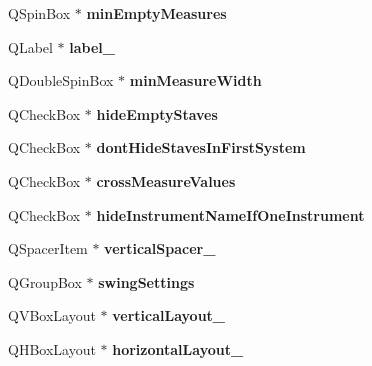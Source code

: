 \begin{DoxyCompactItemize}
Q\+Spin\+Box $\ast$ {\bfseries min\+Empty\+Measures}
\item 
\mbox{\label{class_ui___edit_style_base_ab740e65de6ba74022d6929cf5b3549a3}} 
Q\+Label $\ast$ {\bfseries label\+\_}
\item 
\mbox{\label{class_ui___edit_style_base_ae4a62a7b10ac972d6c32f8f2771af4dd}} 
Q\+Double\+Spin\+Box $\ast$ {\bfseries min\+Measure\+Width}
\item 
\mbox{\label{class_ui___edit_style_base_a24732bb73d0eb75c20dc90dad506a624}} 
Q\+Check\+Box $\ast$ {\bfseries hide\+Empty\+Staves}
\item 
\mbox{\label{class_ui___edit_style_base_a80d95a90205a176b89fe908d80accf44}} 
Q\+Check\+Box $\ast$ {\bfseries dont\+Hide\+Staves\+In\+First\+System}
\item 
\mbox{\label{class_ui___edit_style_base_a4891c73224c05fc1a378ed6cbc2a9be6}} 
Q\+Check\+Box $\ast$ {\bfseries cross\+Measure\+Values}
\item 
\mbox{\label{class_ui___edit_style_base_a85c687db31145cf2ed951a82e05c4f15}} 
Q\+Check\+Box $\ast$ {\bfseries hide\+Instrument\+Name\+If\+One\+Instrument}
\item 
\mbox{\label{class_ui___edit_style_base_a5896e77da4fbaab3ce2f14e668fbfaef}} 
Q\+Spacer\+Item $\ast$ {\bfseries vertical\+Spacer\+\_}
\item 
\mbox{\label{class_ui___edit_style_base_a0d01acc2d1bf53b8f812bbc5201090a4}} 
Q\+Group\+Box $\ast$ {\bfseries swing\+Settings}
\item 
\mbox{\label{class_ui___edit_style_base_a1a1e1349caf0f0b87851bbf386ef9e25}} 
Q\+V\+Box\+Layout $\ast$ {\bfseries vertical\+Layout\+\_}
\item 
\mbox{\label{class_ui___edit_style_base_a2fba48355ff74f379c5d97b1ec4b4ebb}} 
Q\+H\+Box\+Layout $\ast$ {\bfseries horizontal\+Layout\+\_}

\end{DoxyCompactItemize}

